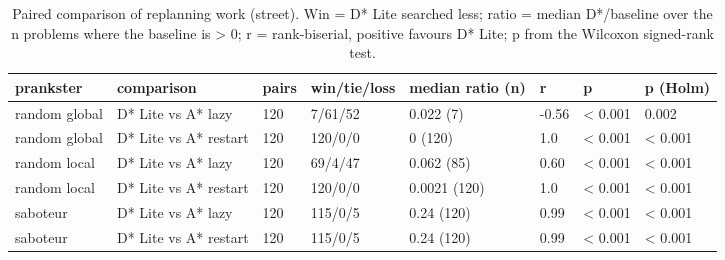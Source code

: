 \begin{table}[t]
\centering
\small
\caption{Paired comparison of replanning work (street). Win = D* Lite searched less; ratio = median D*/baseline over the n problems where the baseline is > 0; r = rank-biserial, positive favours D* Lite; p from the Wilcoxon signed-rank test.}
\label{tab:tests-replan-street}
\begin{tabular}{llllllll}
\toprule
prankster & comparison & pairs & win/tie/loss & median ratio (n) & r & p & p (Holm) \\
\midrule
random global & D* Lite vs A* lazy & 120 & 7/61/52 & 0.022 (7) & -0.56 & < 0.001 & 0.002 \\
random global & D* Lite vs A* restart & 120 & 120/0/0 & 0 (120) & 1.0 & < 0.001 & < 0.001 \\
random local & D* Lite vs A* lazy & 120 & 69/4/47 & 0.062 (85) & 0.60 & < 0.001 & < 0.001 \\
random local & D* Lite vs A* restart & 120 & 120/0/0 & 0.0021 (120) & 1.0 & < 0.001 & < 0.001 \\
saboteur & D* Lite vs A* lazy & 120 & 115/0/5 & 0.24 (120) & 0.99 & < 0.001 & < 0.001 \\
saboteur & D* Lite vs A* restart & 120 & 115/0/5 & 0.24 (120) & 0.99 & < 0.001 & < 0.001 \\
\bottomrule
\end{tabular}
\end{table}
